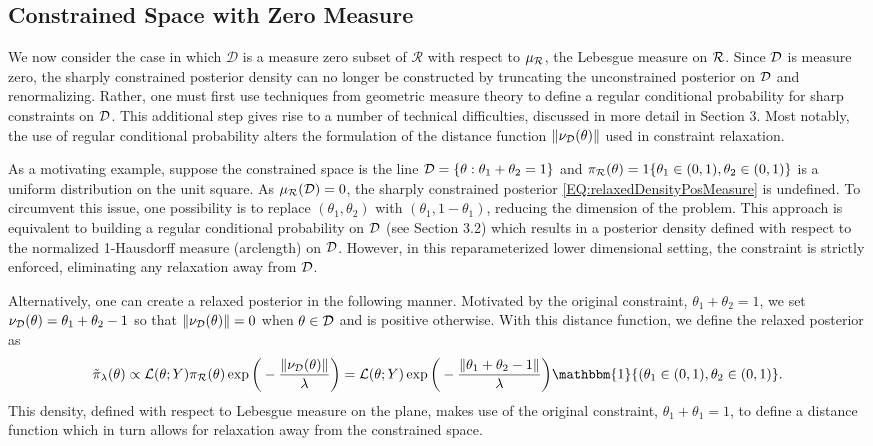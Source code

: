 \documentclass[10pt,fleqn]{article}
\DeclareMathOperator{\1}{\mathbbm{1}} \DeclareMathOperator{\bigO}{\mc O}
\begin{document}
\subsection{Constrained Space with Zero Measure}
\label{SEC:Zero_Measure_Methods}

We now consider the case in which $\mathcal{D}$ is a measure
zero subset of $\mathcal{R}$ with respect to $\mu_{\mathcal{R}}$, the Lebesgue
measure on $\mathcal{R}$. Since $\mathcal{D}$ is measure zero, the sharply constrained posterior density can no longer be constructed by truncating the unconstrained posterior on $\mathcal{D}$ and renormalizing.  Rather, one must first use techniques from geometric measure theory to define a regular conditional probability for sharp constraints on $\mathcal{D}$. This additional step gives rise to a number of technical difficulties, discussed in more detail in Section 3.  Most notably, the use of regular conditional probability alters the formulation of the distance function $\| \nu_{\mathcal{D}}(\theta)\|$ used in constraint relaxation.  

As a motivating example, suppose the constrained space is the line $\mathcal{D} = \{\theta: \theta_1+\theta_2=1\}$ and $\pi_{\mathcal{R}}(\theta) = 1\{\theta_1 \in (0,1),\theta_2 \in (0,1)\}$ is a uniform distribution on the unit square.  As $\mu_{\mathcal{R}}(\mathcal{D})=0$, the sharply constrained posterior \eqref{EQ:relaxedDensityPosMeasure} is
undefined.  To circumvent this issue, one possibility is to replace
 $(\theta_1,\theta_2)$ with $(\theta_1,1-\theta_1)$, reducing the dimension of the problem. This approach is equivalent to building a regular conditional probability on $\mathcal{D}$ (see Section 3.2) which results in a posterior density defined with respect to the normalized 1-Hausdorff measure (arclength) on $\mathcal{D}$. However, in this reparameterized lower dimensional setting, the constraint is strictly enforced, eliminating any relaxation away from $\mathcal{D}$.  
 
Alternatively, one can create a relaxed posterior in the following manner.  Motivated by the original constraint, $\theta_1+\theta_2=1$, we set $\nu_{\mathcal{D}}(\theta) = \theta_1+\theta_2 - 1$ so that $\| \nu_{\mathcal{D}}(\theta) \| =0$ when $\theta \in \mathcal{D}$ and is positive otherwise.  With this distance function, we define the relaxed posterior as 
$$ \tilde{\pi}_\lambda(\theta) \propto \mathcal{L}(\theta;Y) \pi_\mc R (\theta) \exp\bigg(-\frac{\| \nu_{\mc D} (\theta)\|}{\lambda} \bigg) = \mathcal{L}(\theta;Y)  \exp\bigg(- \frac{\| \theta_1 + \theta_2 -1\|}{\lambda}\bigg) \mathbbm{1}\{(\theta_1\in(0,1),\theta_2 \in (0,1)\}.$$  This density, defined with respect to Lebesgue measure on the plane, makes use of the original constraint, $\theta_1+\theta_1=1$, to define a distance function which in turn allows for relaxation away from the constrained space.
\end{document}
